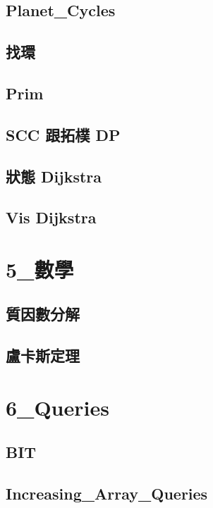 \subsection{Planet_Cycles} 

\subsection{找環} 

\subsection{Prim}

\subsection{SCC 跟拓樸 DP}

\subsection{狀態 Dijkstra}

\subsection{Vis Dijkstra}


\section{5_數學}
\subsection{質因數分解} 

\subsection{盧卡斯定理} 


\section{6_Queries}
\subsection{BIT} 

\subsection{Increasing_Array_Queries}


